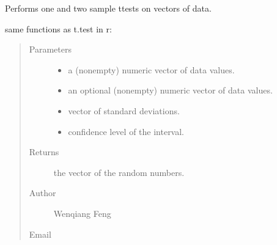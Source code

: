 \documentclass[letterpaper,12pt,english]{sphinxmanual}
\begin{document}
\begin{fulllineitems}
\label{\detokenize{api:statspy.tests.t_test}}
\sphinxAtStartPar
Performs one and two sample t\sphinxhyphen{}tests on vectors of data.

\sphinxAtStartPar
same functions as t.test in r: 

\sphinxAtStartPar
{}
\begin{quote}

\sphinxAtStartPar
{}

\sphinxAtStartPar
{}

\sphinxAtStartPar
{}
\end{quote}
\begin{quote}\begin{description}
\item[{Parameters}] \leavevmode\begin{itemize}
\item {} 
\sphinxAtStartPar
{} \textendash{} a (non\sphinxhyphen{}empty) numeric vector of data values.

\item {} 
\sphinxAtStartPar
{} \textendash{} an optional (non\sphinxhyphen{}empty) numeric vector of data values.

\item {} 
\sphinxAtStartPar
{} \textendash{} vector of standard deviations.

\item {} 
\sphinxAtStartPar
{} \textendash{} confidence level of the interval.

\end{itemize}

\item[{Returns}] \leavevmode
\sphinxAtStartPar
the vector of the random numbers.

\item[{Author}] \leavevmode
\sphinxAtStartPar
Wenqiang Feng

\item[{Email}] \leavevmode
\sphinxAtStartPar
{}

\end{description}\end{quote}

\end{fulllineitems}
\end{document}
